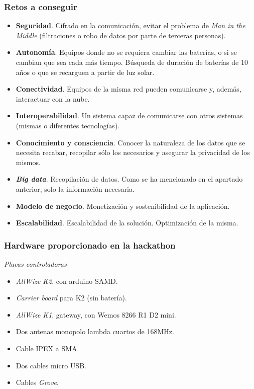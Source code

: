 \documentclass[12pt]{article}
\begin{document}
	
	
	\subsubsection{Retos a conseguir}
	\begin{itemize}
		\item \textbf{Seguridad}. Cifrado en la comunicación, evitar el problema de \textit{Man in the Middle} (filtraciones o robo de datos por parte de terceras personas).
		\item \textbf{Autonomía}. Equipos donde no se requiera cambiar las baterías, o si se cambian que sea cada más tiempo. Búsqueda de duración de baterías de 10 años o que se recarguen a partir de luz solar.
		\item \textbf{Conectividad}. Equipos de la misma red pueden comunicarse y, además, interactuar con la nube.
		\item \textbf{Interoperabilidad}. Un sistema capaz de comunicarse con otros sistemas (mismas o diferentes tecnologías).
		\item \textbf{Conocimiento y consciencia}. Conocer la naturaleza de los datos que se necesita recabar, recopilar sólo los necesarios y asegurar la privacidad de los mismos.
		\item \textbf{\textit{Big data}}. Recopilación de datos. Como se ha mencionado en el apartado anterior, solo la información necesaria.
		\item \textbf{Modelo de negocio}. Monetización y sostenibilidad de la aplicación.
		\item \textbf{Escalabilidad}. Escalabilidad de la solución. Optimización de la misma.
	\end{itemize}

	\subsubsection{Hardware proporcionado en la hackathon} 
	
	\textit{Placas controladoras}
	\begin{itemize}
		\item \textit{AllWize K2}, con arduino SAMD. 
		\item \textit{Carrier board} para K2 (sin batería).
		\item \textit{AllWize K1}, gateway, con Wemos 8266 R1 D2 mini. 
		\item Dos antenas monopolo lambda cuartos de 168MHz.
		\item Cable IPEX a SMA.
		\item Dos cables micro USB.
		\item Cables \textit{Grove}. \\
		
	\end{itemize}
\end{document}
